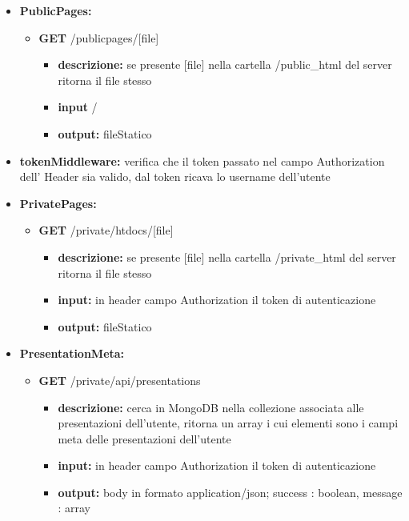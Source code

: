 {{\begin{itemize}
		\item \textbf{PublicPages:}
			\begin{itemize}
			\item  \textbf{GET} /publicpages/[file] 
				\begin{itemize} 
				\item \textbf{descrizione:} se presente [file] nella cartella /public\_html del server ritorna il file stesso 
				\item \textbf{input} /
				\item \textbf{output:} fileStatico
				\end{itemize}
			\end{itemize}
			
		\item \textbf{tokenMiddleware:} verifica che il token passato nel campo Authorization dell' Header sia valido, dal token ricava lo username dell'utente
		
		\item \textbf{PrivatePages:}
			\begin{itemize}
			\item  \textbf{GET} /private/htdocs/[file] 
				\begin{itemize} 
				\item \textbf{descrizione:} se presente [file] nella cartella /private\_html del server ritorna il file stesso
				\item \textbf{input:} in header campo Authorization il token di autenticazione
				\item \textbf{output:} fileStatico
				\end{itemize}
			\end{itemize}
			
		\item \textbf{PresentationMeta:}
			\begin{itemize}
			\item  \textbf{GET} /private/api/presentations 
				\begin{itemize} 
				\item \textbf{descrizione:} cerca in MongoDB nella collezione associata alle presentazioni dell'utente, ritorna un array i cui elementi sono i campi meta delle presentazioni dell'utente
				\item \textbf{input:} in header campo Authorization il token di autenticazione
				\item \textbf{output:} body in formato application/json; success : boolean, message : array
				\end{itemize}
			\end{itemize}
			

\end{itemize}}}
